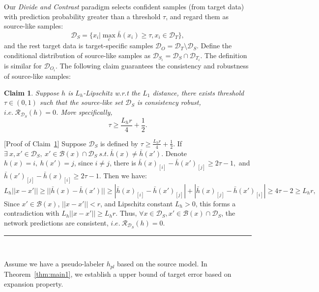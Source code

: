 \documentclass{article}
\newcommand{\BlackBox}{\rule{1.5ex}{1.5ex}}  \fi
\newenvironment{proof}{\par\noindent{\em Proof:\ }}{\hfill\BlackBox\\[.0mm]}
\newtheorem{claim}[theorem]{Claim}
\begin{document}
Our \textit{Divide and Contrast} paradigm selects confident samples (from target data) with prediction probability greater than a threshold $\tau$, and regard them as source-like samples:
$$
    \mathcal{D}_S = \{x_i| \max_c \bar{h}(x_i) \geq \tau , x_i \in \mathcal{D}_T\},
$$
and the rest target data is target-specific samples $\mathcal{D}_O = \mathcal{D}_T \setminus \mathcal{D}_S$.
Define the conditional distribution of source-like samples as $\mathcal{D}_{S_i} = \mathcal{D}_S \cap \mathcal{D}_{T_i}$.
The definition is similar for $\mathcal{D}_{O_i}$. 
The following claim guarantees the consistency and robustness of source-like samples:

\begin{claim}\label{claim:src} Suppose $h$ is $L_h$-Lipschitz w.r.t the $L_1$ distance, there exists threshold $\tau \in (0,1)$ such that the source-like set $\mathcal{D}_S$ is consistency robust, $i.e. \ \mathcal{R}_{\mathcal{D}_S}(h) = 0$. More specifically, 
\begin{equation*}
    \tau \geq \frac{L_h r}{4}+ \frac{1}{2}.
\end{equation*}
\end{claim}

\begin{proof}[Proof of Claim~\ref{claim:src}]
 Suppose $\mathcal{D}_S$ is defined by $\tau \geq \frac{L_h r}{4}+ \frac{1}{2}$. 
If $\exists\ x,x'\in \mathcal{D}_S, \ x'\in \mathcal{B}(x)\cap \mathcal{D}_S\ s.t. \ \bar{h}(x)\neq \bar{h}(x').$ Denote $h(x)=i, \ h(x')=j$, since $i\neq j$, there is $\bar{h}(x)_{[i]}-\bar{h}(x')_{[j]}\geq 2\tau -1,$ and $\bar{h}(x')_{[j]}-\bar{h}(x)_{[i]}\geq 2\tau -1$. Then we have:
\begin{equation*}
    L_h||x-x'||\geq||\bar{h}(x) - \bar{h}(x')||\geq|\bar{h}(x)_{[i]}-\bar{h}(x')_{[j]}|+|\bar{h}(x)_{[j]}-\bar{h}(x')_{[i]}|\geq 4\tau-2\geq L_h r,
\end{equation*}
Since $x'\in\mathcal{B}(x)$, $||x-x'||<r$, and Lipschitz constant $L_h>0$, this forms a contradiction with $L_h||x-x'||\geq L_h r$. Thus, $\forall x\in \mathcal{D}_S, x'\in \mathcal{B}(x)\cap \mathcal{D}_S$, the network predictions are consistent, $i.e. \ \mathcal{R}_{\mathcal{D}_S}(h) = 0$.
\end{proof}

Assume we have a pseudo-labeler $h_{pl}$ based on the source model. In Theorem~\ref{thm:main1}, we establish a upper bound of target error based on expansion property.
\end{document}
